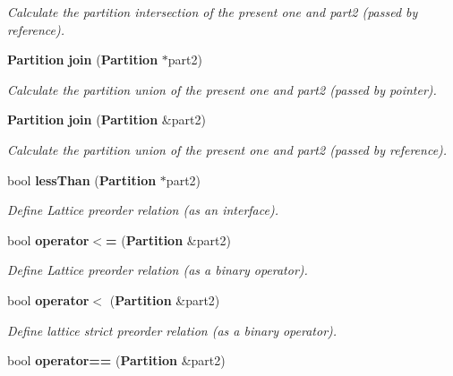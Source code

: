 \begin{CompactItemize}
\begin{CompactList}\small\item\em Calculate the partition intersection of the present one and part2 (passed by reference). \item\end{CompactList}\item 
{\bf Partition} {\bf join} ({\bf Partition} $\ast$part2)\label{classPartition_a63}

\begin{CompactList}\small\item\em Calculate the partition union of the present one and part2 (passed by pointer). \item\end{CompactList}\item 
{\bf Partition} {\bf join} ({\bf Partition} \&part2)\label{classPartition_a64}

\begin{CompactList}\small\item\em Calculate the partition union of the present one and part2 (passed by reference). \item\end{CompactList}\item 
bool {\bf less\-Than} ({\bf Partition} $\ast$part2)\label{classPartition_a65}

\begin{CompactList}\small\item\em Define Lattice preorder relation (as an interface). \item\end{CompactList}\item 
bool {\bf operator$<$=} ({\bf Partition} \&part2)\label{classPartition_a66}

\begin{CompactList}\small\item\em Define Lattice preorder relation (as a binary operator). \item\end{CompactList}\item 
bool {\bf operator$<$} ({\bf Partition} \&part2)\label{classPartition_a67}

\begin{CompactList}\small\item\em Define lattice strict preorder relation (as a binary operator). \item\end{CompactList}\item 
bool {\bf operator==} ({\bf Partition} \&part2)\label{classPartition_a68}


\end{CompactItemize}
